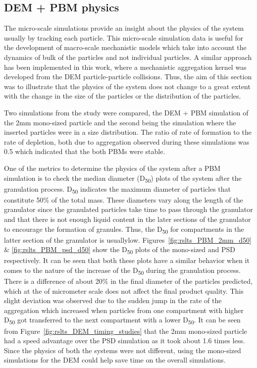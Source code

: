 \documentclass[preprint,11pt,authoryear]{elsarticle}
\begin{document}
\subsection{DEM + PBM physics}
The micro-scale simulations provide an insight about the physics of the system usually by tracking 
each particle. This micro-scale simulation data is useful for the development of macro-scale 
mechanistic models which take into account the dynamics of bulk of the particles and not individual 
particles. A similar approach has been implemented in this work, where a mechanistic aggregation 
kernel was developed from the DEM particle-particle collisions. Thus, the aim of this section was to 
illustrate that the physics of the system does not change to a great extent with the change in the size 
of the particles or the distribution of the particles.

Two simulations from the study were compared, the DEM + PBM simulation of the 2mm 
mono-sized particle and the second being the simulation where the inserted particles were in a size 
distribution. The ratio of rate of formation to the rate of depletion, both due to aggregation 
observed during these simulations was 0.5 which indicated that the both PBMs were stable.

One of the metrics to determine the physics of the system after a PBM simulation is to check the 
median diameter (D\textsubscript{50}) plots of the system after the granulation process. 
D\textsubscript{50} indicates the maximum diameter of particles that constitute 50\% of the total mass. 
These diameters vary along the length of the granulator since the granulated particles take time to 
pass through the granulator and that there is not enough liquid content in the later sections of 
the granulator to encourage the formation of granules. Thus, the D\textsubscript{50} for compartments 
in the latter section of the granulator is usuallylow. Figures~\ref{fig:rslts_PBM_2mm_d50} \& 
\ref{fig:rslts_PBM_psd_d50} show the D\textsubscript{50} plots of the mono-sized and PSD respectively. 
It can be seen that both these plots have a similar behavior when it comes to the nature of the 
increase of the D\textsubscript{50} during the granulation process. There is a difference of about 
20\% in the final diameter of the particles predicted, which at the of micrometer scale does not affect 
the final product quality. This slight deviation was observed due to the sudden jump in the 
rate of the aggregation which increased when particles from one compartment with higher 
D\textsubscript{50} got transferred to the next compartment with a lower D\textsubscript{50}. 
It can be seen from Figure~\ref{fig:rslts_DEM_timing_studies} that the 2mm mono-sized particle had a speed
advantage over the PSD simulation as it took about 1.6 times less. Since the physics of both the 
systems were not different, using the mono-sized simulations for the DEM could help save time on 
the overall simulations. 
\end{document}
